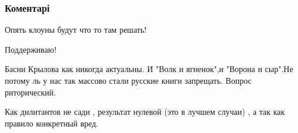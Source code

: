  
 
 
 
 
\subsubsection{Коментарі}
\label{sec:10_09_2021.fb.ivanochko_inna.1.narod_vlast_otvetstvennost.cmt}

\begin{itemize}
 
Опять клоуны будут что то там решать!

 
Поддерживаю!

 

Басни Крылова как никогда актуальны. И "Волк и ягненок",и "Ворона и сыр".Не
потому ль у нас так массово стали русские книги запрещать. Вопрос риторический.


 
Как дилитантов не сади , результат нулевой (это в лучшем случаи) , а так как правило конкретный вред.

 


\end{itemize}
